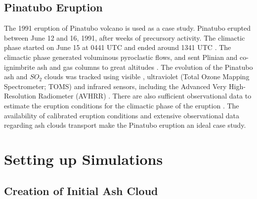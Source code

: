 \documentclass[draft,linenumbers]{agujournal2019}
\begin{document}
\subsection{Pinatubo Eruption}

The 1991 eruption of Pinatubo volcano is used as a case study.  Pinatubo erupted between June 12 and 16, 1991, after weeks of precursory activity. The climactic phase started on June 15 at 0441 UTC and ended around 1341 UTC \citep{holasek1996satellite}. The climactic phase generated voluminous pyroclastic flows, and sent Plinian and co-ignimbrite ash and gas columns to great altitudes \citep{scott1996pyroclastic}. The evolution of the Pinatubo ash and $SO_2$ clouds was tracked using visible \citep{holasek1996satellite}, ultraviolet (Total Ozone Mapping Spectrometer; TOMS) \citep{guo2004re} and infrared sensors, including the Advanced Very High-Resolution Radiometer (AVHRR) \citep{guo2004particles}. There are also sufficient observational data to estimate the eruption conditions for the climactic phase of the eruption \citep{suzuki2009three}. The availability of calibrated eruption conditions and extensive observational data regarding ash clouds transport make the Pinatubo eruption an ideal case study.

\section{Setting up Simulations} \label{sec:Methodology}

\subsection{Creation of Initial Ash Cloud} \label{sec:create-initial-condition}
\end{document}
